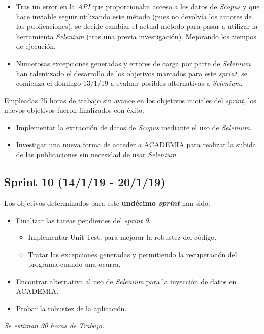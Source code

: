 \begin{itemize}
	\item Tras un error en la \emph{API} que proporcionaba acceso a los datos de \emph{Scopus} y que hace inviable seguir utilizando este método (pues no devolvía los autores de las publicaciones), se decide cambiar el actual método para pasar a utilizar la herramienta \emph{Selenium} (tras una previa investigación). Mejorando los tiempos de ejecución.
	\item Numerosas excepciones generadas y errores de carga por parte de \emph{Selenium} han ralentizado el desarrollo de los objetivos marcados para este \emph{sprint}, se comienza el domingo 13/1/19 a evaluar posibles alternativas a \emph{Selenium}.
\end{itemize}

Empleadas 25 horas de trabajo sin avance en los objetivos iniciales del \emph{sprint}, los nuevos objetivos fueron finalizados con éxito.
\begin{itemize}
	\item Implementar la extracción de datos de  \emph{Scopus} mediante el uso de \emph{Selenium}.
	\item Investigar una nueva forma de acceder a ACADEMIA para realizar la subida de las publicaciones sin necesidad de usar \emph{Selenium}
\end{itemize}

\subsection{Sprint 10 (14/1/19 - 20/1/19)}
Los objetivos determinados para este \textbf{undécimo \emph{sprint}} han sido:
\begin{itemize}
	\item Finalizar las tareas pendientes del \emph{sprint 9}.
		\begin{itemize}
			\item Implementar Unit Test, para mejorar la robustez del código.
			\item Tratar las excepciones generadas y permitiendo la recuperación del programa cuando una ocurra.
		\end{itemize}
	\item Encontrar alternativa al uso de \emph{Selenium} para la inyección de datos en ACADEMIA.
	\item Probar la robustez de la aplicación.
\end{itemize}

\emph{Se estiman 30 horas de Trabajo.}

